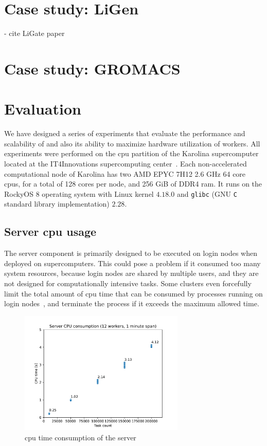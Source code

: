 \section{Case study: LiGen}
- cite LiGate paper

\section{Case study: GROMACS}

\section{Evaluation}
We have designed a series of experiments that evaluate the performance and scalability of
\hyperqueue{} and also its ability to maximize hardware utilization of workers. All
experiments were performed on the \gls{cpu} partition of the Karolina
supercomputer~\cite{karolina} located at the IT4Innovations supercomputing
center~\cite{it4i}. Each non-accelerated computational node of Karolina has two AMD
EPYC\texttrademark{} 7H12 2.6 GHz 64 core \glspl{cpu}, for a total of 128 cores
per node, and 256 GiB of DDR4 \gls{ram}. It runs on the RockyOS 8 operating system
with Linux kernel $4.18.0$ and \texttt{glibc} (GNU \texttt{C} standard library implementation) $2.28$.


\subsection{Server \gls{cpu} usage}
\label{sec:hq-exp-server-cpu-usage}
The \hyperqueue{} server component is primarily designed to be executed on login nodes
when deployed on supercomputers. This could pose a problem if it consumed too many system
resources, because login nodes are shared by multiple users, and they are not designed for
computationally intensive tasks. Some clusters even forcefully limit the total amount of
\gls{cpu} time that can be consumed by processes running on login
nodes~\cite{leonardo_time_limit}, and terminate the process if it exceeds the maximum allowed time.

\begin{figure}[h]
	\centering
	\includegraphics[width=0.7\textwidth]{imgs/hq/charts/server-utilization-tasks}
	\caption{\gls{cpu} time consumption of the \hyperqueue{} server}
	\label{fig:hq-server-cpu-consumption}
\end{figure}

